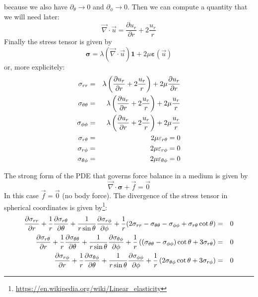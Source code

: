 because we also have $\partial_\theta \rightarrow 0$ and $\partial_\phi \rightarrow 0$.
Then we can compute a quantity that we will need later:
\[
\vec{\nabla}\cdot\vec{u} = \frac{\partial u_r}{\partial r} + 2 \frac{u_r}{r}
\]
Finally the stress tensor is given by 
\[
{\bm \sigma}=\lambda (\vec{\nabla}\cdot\vec{u}) {\bm 1} +2\mu {\bm \varepsilon}(\vec{u}) 
\]
or, more explicitely:
\begin{eqnarray}
\sigma_{rr} &=&   \lambda \left(  \frac{\partial u_r}{\partial r} + 2 \frac{u_r}{r} \right)
+ 2 \mu \frac{\partial u_r}{\partial r}  \nonumber\\
\sigma_{\theta\theta} &=& \lambda \left(  \frac{\partial u_r}{\partial r} + 2 \frac{u_r}{r} \right)
+ 2 \mu \frac{u_r}{r} \nonumber\\
\sigma_{\phi\phi} &=&  \lambda \left(  \frac{\partial u_r}{\partial r} + 2 \frac{u_r}{r} \right)
+ 2 \mu \frac{u_r}{r} \nonumber\\
\sigma_{r\theta} &=& 2\mu \varepsilon_{r\theta} = 0 \nonumber\\ 
\sigma_{r\phi} &=& 2\mu\varepsilon_{r\phi} = 0 \nonumber\\ 
\sigma_{\theta\phi} &=& 2\mu  \varepsilon_{\theta\phi} = 0 
\end{eqnarray}

The strong form of the PDE that governs force balance in a medium is given by
\[
\vec\nabla \cdot {\bm \sigma} + \vec{f} = \vec{0}
\]
In this case $\vec{f}=\vec{0}$ (no body force).
The divergence of the stress tensor in spherical coordinates is given 
by\footnote{\url{https://en.wikipedia.org/wiki/Linear_elasticity}}:
\begin{eqnarray}
\frac{\partial \sigma_{rr}}{\partial r} + \frac{1}{r} \frac{\partial \sigma_{r\theta}}{\partial \theta}
+\frac{1}{r \sin \theta} \frac{\partial \sigma_{r\phi}}{\partial \phi}
+\frac{1}{r} (2\sigma_{rr} -\sigma_{\theta\theta} -\sigma_{\phi\phi} 
+ \sigma_{r\theta} \cot \theta) &=& 0 
\nonumber\\
\frac{\partial \sigma_{r\theta}}{\partial r}+
\frac{1}{r}\frac{\partial \sigma_{\theta\theta}}{\partial \theta}+
\frac{1}{r \sin \theta} \frac{\partial \sigma_{\theta\phi}}{\partial \phi}
+\frac{1}{r} \left(
(\sigma_{\theta\theta}-\sigma_{\phi\phi})\cot \theta + 3 \sigma_{r\theta} 
\right)&=& 0 
\nonumber\\
\frac{\partial \sigma_{r\phi}}{\partial r}+
\frac{1}{r}\frac{\partial \sigma_{\theta\phi}}{\partial \theta}+
\frac{1}{r \sin \theta} \frac{\partial \sigma_{\phi\phi}}{\partial \phi}
+\frac{1}{r} \left(
2\sigma_{\theta\phi} \cot\theta + 3 \sigma_{r\phi}
\right)&=& 0  \nonumber
\end{eqnarray}

